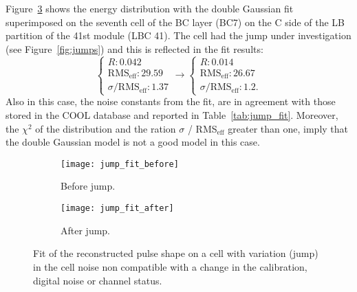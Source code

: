 Figure~\ref{fig:jump_fit} shows the energy distribution with the double Gaussian
fit superimposed on the seventh cell of the BC layer (BC7) on the C side of the
LB partition of the 41st module (LBC 41). The cell had the jump under
investigation (see Figure~\ref{fig:jumps}) and this is reflected in the fit results:
\begin{equation}
  \label{eq:75}
  \begin{cases}
    R : 0.042 \\
    \text{RMS}_{\text{eff}}: 29.59 \\
    \sigma / \text{RMS}_{\text{eff}}: 1.37
  \end{cases}
  \to
  \begin{cases}
    R : 0.014 \\
    \text{RMS}_\text{{eff}} : 26.67 \\
    \sigma / \text{RMS}_{\text{eff}}: 1.2.
  \end{cases}
\end{equation}
Also in this case, the noise constants from the fit, are in agreement with those
stored in the COOL database and reported in  Table~\ref{tab:jump_fit}. Moreover,
the $\chi^2$ of the distribution and the ration $\sigma$ / RMS$_{\text{eff}}$
greater than one, imply that the double Gaussian model is not a good model in
this case.

\begin{figure}[!h]
  \centering
  \begin{subfigure}[t]{.7\linewidth}
    \texttt{[image: jump\_fit\_before]}
    \caption{Before jump.}
    \label{fig:jump_fit_before}
  \end{subfigure}

  \begin{subfigure}[t]{.7\linewidth}
    \texttt{[image: jump\_fit\_after]}
    \caption{After jump.}
    \label{fig:jump_fit_after}
  \end{subfigure}
  \caption{Fit of the reconstructed pulse shape on a cell with variation (jump)
    in the cell noise non compatible with a change in the calibration, digital
    noise or channel status.}
  \label{fig:jump_fit}
\end{figure}

